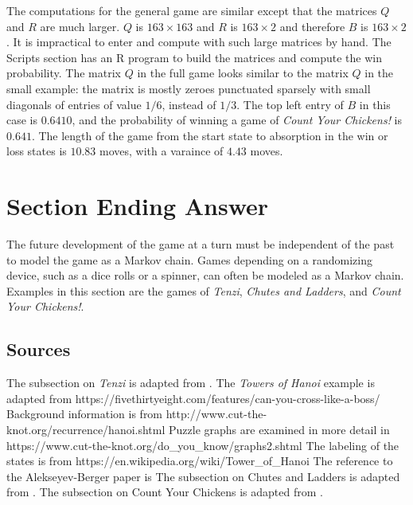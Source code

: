 \documentclass[12pt]{article}
\begin{document}
The computations for the general game are similar except that the
matrices \( Q \) and \( R \) are much larger.  \( Q \) is \( 163 \times
163 \) and \( R \) is \( 163 \times 2 \) and therefore \( B \) is \( 163
\times 2 \).  It is impractical to enter and compute with such large
matrices by hand.  The Scripts section has an R program to build the
matrices and compute the win probability.  The matrix \( Q \) in the
full game looks similar to the matrix \( Q \) in the small example:  the
matrix is mostly zeroes punctuated sparsely with small diagonals of
entries of value \( 1/6 \), instead of \( 1/3 \).  The top left entry of
\( B \) in this case is \( 0.6410 \), and the probability of winning a
game of \emph{Count Your Chickens!} is \( 0.641 \).  The length of the
game from the start state to absorption in the win or loss states is \(
10.83 \) moves, with a varaince of \( 4.43 \) moves.

\section*{Section Ending Answer} The future development of the game at a
turn must be independent of the past to model the game as a Markov
chain.  Games depending on a randomizing device, such as a dice rolls or
a spinner, can often be modeled as a Markov chain.  Examples in this
section are the games of \emph{Tenzi}, \emph{Chutes and Ladders}, and
\emph{Count Your Chickens!}.

\subsection*{Sources}

The subsection on \emph{Tenzi} is adapted from
\cite{bacinski20}. The \emph{Towers of Hanoi} example is adapted from
https://fivethirtyeight.com/features/can-you-cross-like-a-boss/
Background information is from
http://www.cut-the-knot.org/recurrence/hanoi.shtml Puzzle graphs are
examined in more detail in https://www.cut-the-knot.org/do\_you\_know/graphs2.shtml
The labeling of the states is from https://en.wikipedia.org/wiki/Tower\_of\_Hanoi
The reference to the Alekseyev-Berger paper is
\cite{Alekseyev2015} The subsection on Chutes and Ladders is adapted
from
\cite{althoen93}.  The subsection on Count Your Chickens is adapted
from
\cite{mccune19}.

\hr

\end{document}
